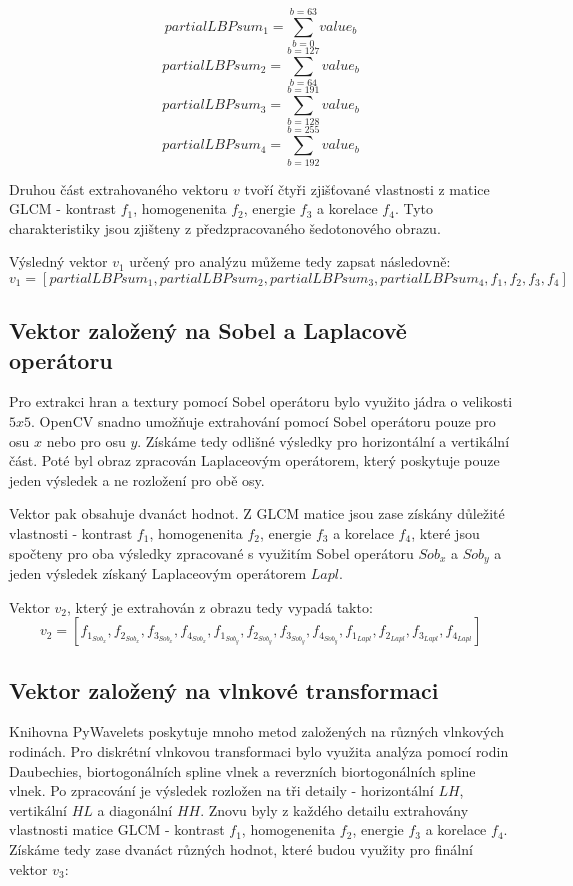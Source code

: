 $$partialLBPsum_1 = \sum_{b=0}^{b=63} value_b $$
$$partialLBPsum_2 = \sum_{b=64}^{b=127} value_b $$
$$partialLBPsum_3 = \sum_{b=128}^{b=191} value_b $$
$$partialLBPsum_4 = \sum_{b=192}^{b=255} value_b $$

Druhou část extrahovaného vektoru $v$ tvoří čtyři zjišťované vlastnosti z matice GLCM - kontrast $f_1$, homogenenita $f_2$, energie $f_3$ a korelace $f_4$. Tyto charakteristiky jsou zjišteny z předzpracovaného šedotonového obrazu.

Výsledný vektor $v_1$ určený pro analýzu můžeme tedy zapsat následovně:
$$v_1 = [partialLBPsum_1, partialLBPsum_2, partialLBPsum_3, partialLBPsum_4, f_1, f_2, f_3, f_4]$$

\subsection{Vektor založený na Sobel a Laplacově operátoru}
Pro extrakci hran a textury pomocí Sobel operátoru bylo využito jádra o velikosti $5x5$. OpenCV snadno umožňuje extrahování pomocí Sobel operátoru pouze pro osu $x$ nebo pro osu $y$. Získáme tedy odlišné výsledky pro horizontální a vertikální část. Poté byl obraz zpracován Laplaceovým operátorem, který poskytuje pouze jeden výsledek a ne rozložení pro obě osy. 

Vektor pak obsahuje dvanáct hodnot. Z GLCM matice jsou zase získány důležité vlastnosti - kontrast $f_1$, homogenenita $f_2$, energie $f_3$ a korelace $f_4$, které jsou spočteny pro oba výsledky zpracované s využitím Sobel operátoru $Sob_x$ a $Sob_y$ a jeden výsledek získaný Laplaceovým operátorem $Lapl$.

Vektor $v_2$, který je extrahován z obrazu tedy vypadá takto:
$$v_2 = [f_{1_{Sob_x}}, f_{2_{Sob_x}}, f_{3_{Sob_x}}, f_{4_{Sob_x}}, f_{1_{Sob_y}}, f_{2_{Sob_y}}, f_{3_{Sob_y}}, f_{4_{Sob_y}}, f_{1_{Lapl}}, f_{2_{Lapl}}, f_{3_{Lapl}}, f_{4_{Lapl}}]$$

\subsection{Vektor založený na vlnkové transformaci}
Knihovna PyWavelets poskytuje mnoho metod založených na různých vlnkových rodinách. Pro diskrétní vlnkovou transformaci bylo využita analýza pomocí rodin Daubechies, biortogonálních spline vlnek a reverzních biortogonálních spline vlnek. Po zpracování je výsledek rozložen na tři detaily - horizontální $LH$, vertikální $HL$ a diagonální $HH$. Znovu byly z každého detailu extrahovány vlastnosti matice GLCM - kontrast $f_1$, homogenenita $f_2$, energie $f_3$ a korelace $f_4$. Získáme tedy zase dvanáct různých hodnot, které budou využity pro finální vektor $v_3$:

